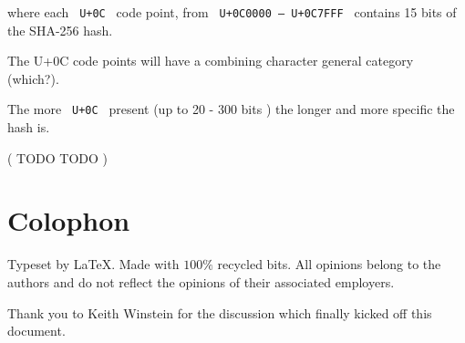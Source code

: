 \documentclass[12pt]{article}
\begin{document}

where each \texttt{ U+0C } code point, from \texttt { U+0C0000 — U+0C7FFF } contains
15 bits of the SHA-256 hash.

The U+0C code points will have a combining character general category (which?).  

The more  \texttt{ U+0C }  present (up to 20 - 300 bits ) the longer and more specific the hash is.

( TODO TODO )



\clearpage
{}
\printbibliography
\section*{Colophon}

Typeset by \LaTeX . Made with \( 100\%  \) recycled bits.
All opinions belong to the authors and do not reflect the opinions
of their associated employers.

Thank you to Keith Winstein for the discussion which finally kicked off this document.
\end{document}
